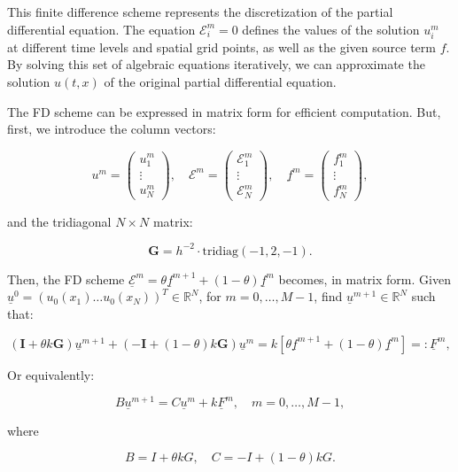 This finite difference scheme represents the discretization of the partial differential equation. The equation $\mathcal{E}^{m}_{i} = 0$ defines the values of the solution $u^{m}_{i}$ at different time levels and spatial grid points, as well as the given source term $f$. By solving this set of algebraic equations iteratively, we can approximate the solution $u(t, x)$ of the original partial differential equation.


The FD scheme can be expressed in matrix form for efficient computation. But, first, we introduce the column vectors:

\[
u^{m} = \begin{pmatrix}
u^{m}_{1} \\
\vdots \\
u^{m}_{N}
\end{pmatrix}, \quad
\mathcal{E}^{m} = \begin{pmatrix}
\mathcal{E}^{m}_{1} \\
\vdots \\
\mathcal{E}^{m}_{N}
\end{pmatrix}, \quad
\underline{f}^{m} = \begin{pmatrix}
f^{m}_{1} \\
\vdots \\
f^{m}_{N}
\end{pmatrix},
\]

and the tridiagonal $N \times N$ matrix:

\[
\textbf{G} = h^{-2} \cdot \text{tridiag}(-1, 2, -1).
\]

Then, the FD scheme $\underline{\mathcal{E}}^{m} = \theta \underline{f}^{m+1} + (1 - \theta) \underline{f}^{m}$ becomes, in matrix form. Given $\underline{u}^{0} = (u_{0}(x_{1}) \hdots u_{0}(x_{N}))^T  \in \mathbb{R}^{N}$, for $m = 0, \ldots, M-1$, find $\underline{u}^{m+1} \in \mathbb{R}^{N}$ such that:

\[
(\textbf{I} + \theta k \textbf{G}) \underline{u}^{m+1} + (-\textbf{I} + (1 - \theta) k \textbf{G}) \underline{u}^{m} = k [\theta \underline{f}^{m+1} + (1 - \theta) \underline{f}^{m}] =: \underline{F}^{m},
\]

Or equivalently:

\[
B \underline{u}^{m+1} = C \underline{u}^{m} + k \underline{F}^{m}, \quad m = 0, \ldots, M-1,
\]

where

\[
B = I + \theta kG, \quad C = -I + (1 - \theta) kG.
\]

